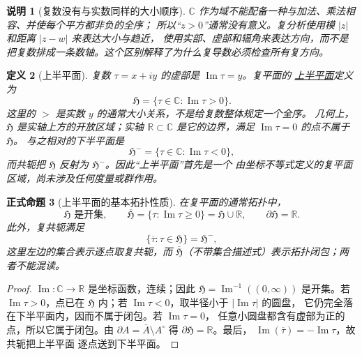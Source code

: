 \documentclass[UTF8,fontset=none,a4paper,11pt]{ctexart}
\theoremstyle{foundation-definition}
\newtheorem{definition}{定义}[section]
\theoremstyle{foundation-theorem}
\theoremstyle{foundation-proposition}
\newtheorem{proposition}[definition]{正式命题}
\theoremstyle{foundation-example}
\theoremstyle{foundation-remark}
\newtheorem{remark}[definition]{说明}
\theoremstyle{foundation-theorem}
\newcommand{\term}[2]{\hyperref[#1]{#2}}
\begin{document}
\begin{remark}[复数没有与实数同样的大小顺序]
\(\mathbb C\) 作为域不能配备一种与加法、乘法相容、并使每个平方都非负的全序；
所以“\(z>0\)”通常没有意义。复分析使用模 \(|z|\) 和距离 \(|z-w|\) 来表达大小与趋近，
使用实部、虚部和辐角来表达方向，而不是把复数排成一条数轴。这个区别解释了为什么复导数必须检查所有复方向。
\end{remark}

\begin{definition}[上半平面]\label{def:upper-half-plane}
复数 \(\tau=x+iy\) 的虚部是 \(\operatorname{Im}\tau=y\)。复平面的
\term{def:upper-half-plane}{上半平面}定义为
\[
\mathfrak H=\{\tau\in\mathbb C:\operatorname{Im}\tau>0\}.
\]
这里的 \(>\) 是实数 \(y\) 的通常大小关系，不是给复数整体规定一个全序。
几何上，\(\mathfrak H\) 是实轴上方的开放区域；实轴 \(\mathbb R\subset\mathbb C\)
是它的边界，满足 \(\operatorname{Im}\tau=0\) 的点不属于 \(\mathfrak H\)。
与之相对的下半平面是
\[
\mathfrak H^-=\{\tau\in\mathbb C:\operatorname{Im}\tau<0\},
\]
而共轭把 \(\mathfrak H\) 反射为 \(\mathfrak H^-\)。因此“上半平面”首先是一个
由坐标不等式定义的复平面区域，尚未涉及任何度量或群作用。
\end{definition}

\begin{proposition}[上半平面的基本拓扑性质]\label{prop:upper-half-plane-basic}
在复平面的通常拓扑中，
\[
\mathfrak H\text{ 是开集},\qquad
\overline{\mathfrak H}=\{\tau:\operatorname{Im}\tau\geq0\}
  =\mathfrak H\cup\mathbb R,\qquad
\partial\mathfrak H=\mathbb R.
\]
此外，复共轭满足
\[
\{\overline\tau:\tau\in\mathfrak H\}=\mathfrak H^-,
\]
这里左边的集合表示逐点取复共轭，而
\(\overline{\mathfrak H}\)（不带集合描述式）表示拓扑闭包；两者不能混读。
\end{proposition}

\begin{proof}
\(\operatorname{Im}:\mathbb C\to\mathbb R\) 是坐标函数，连续；因此
\(\mathfrak H=\operatorname{Im}^{-1}((0,\infty))\) 是开集。若
\(\operatorname{Im}\tau>0\)，点已在 \(\mathfrak H\) 内；若
\(\operatorname{Im}\tau<0\)，取半径小于 \(|\operatorname{Im}\tau|\) 的圆盘，
它仍完全落在下半平面内，因而不属于闭包。若 \(\operatorname{Im}\tau=0\)，
任意小圆盘都含有虚部为正的点，所以它属于闭包。由
\(\partial A=\overline A\setminus A^\circ\) 得
\(\partial\mathfrak H=\mathbb R\)。最后，
\(\operatorname{Im}(\overline\tau)=-\operatorname{Im}\tau\)，故共轭把上半平面
逐点送到下半平面。
\end{proof}
\end{document}
